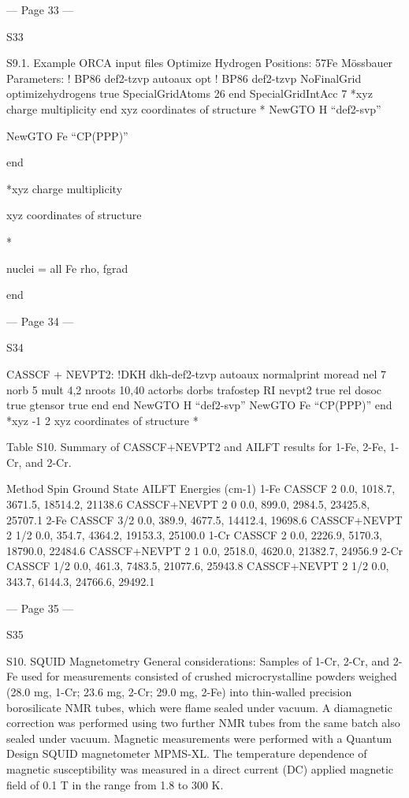  


--- Page 33 ---
 
 
S33 
 
 
S9.1. Example ORCA input files 
Optimize Hydrogen Positions: 
57Fe Mössbauer Parameters: 
! BP86 def2-tzvp autoaux opt 
! BP86 def2-tzvp NoFinalGrid 
optimizehydrogens true 
SpecialGridAtoms 26 
end 
SpecialGridIntAcc 7 
*xyz charge multiplicity 
end 
xyz coordinates of structure 
* 
NewGTO H “def2-svp” 
 
NewGTO Fe “CP(PPP)” 
 
end 
 
*xyz charge multiplicity 
 
xyz coordinates of structure 
 
* 
 
 
nuclei = all Fe {rho, fgrad} 
 
end 
 
 
 


--- Page 34 ---
 
 
S34 
 
 
CASSCF + NEVPT2: 
!DKH dkh-def2-tzvp autoaux normalprint moread 
nel 7 
norb 5 
mult 4,2 
nroots 10,40 
actorbs dorbs 
trafostep RI 
nevpt2 true 
rel 
dosoc true 
gtensor true 
end 
end 
NewGTO H “def2-svp” 
NewGTO Fe “CP(PPP)” 
end 
*xyz -1 2 
xyz coordinates of structure 
* 
 
 
Table S10. Summary of CASSCF+NEVPT2 and AILFT results for 1-Fe, 2-Fe, 1-Cr, and 2-Cr. 
 
Method 
Spin Ground 
State 
AILFT Energies (cm-1) 
1-Fe 
CASSCF 
2 
0.0, 1018.7, 3671.5, 18514.2, 21138.6 
CASSCF+NEVPT
2 
0 
0.0, 899.0, 2984.5, 23425.8, 25707.1 
2-Fe 
CASSCF 
3/2 
0.0, 389.9, 4677.5, 14412.4, 19698.6 
CASSCF+NEVPT
2 
1/2 
0.0, 354.7, 4364.2, 19153.3, 25100.0 
1-Cr 
CASSCF 
2 
0.0, 2226.9, 5170.3, 18790.0, 22484.6 
CASSCF+NEVPT
2 
1 
0.0, 2518.0, 4620.0, 21382.7, 24956.9 
2-Cr 
CASSCF 
1/2 
0.0, 461.3, 7483.5, 21077.6, 25943.8 
CASSCF+NEVPT
2 
1/2 
0.0, 343.7, 6144.3, 24766.6, 29492.1 
 
 


--- Page 35 ---
 
 
S35 
 
 
S10. SQUID Magnetometry 
General considerations: Samples of 1-Cr, 2-Cr, and 2-Fe used for measurements consisted of crushed 
microcrystalline powders weighed (28.0 mg, 1-Cr; 23.6 mg, 2-Cr; 29.0 mg, 2-Fe) into thin-walled precision 
borosilicate NMR tubes, which were flame sealed under vacuum. A diamagnetic correction was performed using 
two further NMR tubes from the same batch also sealed under vacuum. 
Magnetic measurements were performed with a Quantum Design SQUID magnetometer MPMS-XL. The 
temperature dependence of magnetic susceptibility was measured in a direct current (DC) applied magnetic field 
of 0.1 T in the range from 1.8 to 300 K. 
 
